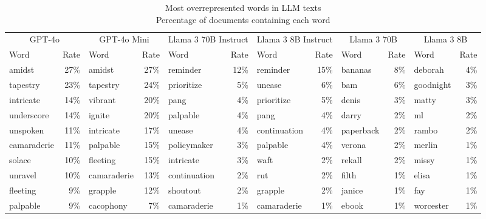 \begin{table}[!t]
\caption*{
{\large Most overrepresented words in LLM texts} \\ 
{\small Percentage of documents containing each word}
} 
\fontsize{12.0pt}{14.4pt}\selectfont
\begin{tabular*}{\linewidth}{@{\extracolsep{\fill}}lrlrlrlrlrlr}
\toprule
\multicolumn{2}{c}{GPT-4o} & \multicolumn{2}{c}{GPT-4o Mini} & \multicolumn{2}{c}{Llama 3 70B Instruct} & \multicolumn{2}{c}{Llama 3 8B Instruct} & \multicolumn{2}{c}{Llama 3 70B} & \multicolumn{2}{c}{Llama 3 8B} \\ 
\cmidrule(lr){1-2} \cmidrule(lr){3-4} \cmidrule(lr){5-6} \cmidrule(lr){7-8} \cmidrule(lr){9-10} \cmidrule(lr){11-12}
Word & Rate & Word & Rate & Word & Rate & Word & Rate & Word & Rate & Word & Rate \\ 
\midrule\addlinespace[2.5pt]
amidst & 27\% & amidst & 27\% & reminder & 12\% & reminder & 15\% & bananas & 8\% & deborah & 4\% \\ 
tapestry & 23\% & tapestry & 24\% & prioritize & 5\% & unease & 6\% & bam & 6\% & goodnight & 3\% \\ 
intricate & 14\% & vibrant & 20\% & pang & 4\% & prioritize & 5\% & denis & 3\% & matty & 3\% \\ 
underscore & 14\% & ignite & 20\% & palpable & 4\% & pang & 4\% & darry & 2\% & ml & 2\% \\ 
unspoken & 11\% & intricate & 17\% & unease & 4\% & continuation & 4\% & paperback & 2\% & rambo & 2\% \\ 
camaraderie & 11\% & palpable & 15\% & policymaker & 3\% & palpable & 4\% & verona & 2\% & merlin & 1\% \\ 
solace & 10\% & fleeting & 15\% & intricate & 3\% & waft & 2\% & rekall & 2\% & missy & 1\% \\ 
unravel & 10\% & camaraderie & 13\% & continuation & 2\% & rut & 2\% & filth & 1\% & elisa & 1\% \\ 
fleeting & 9\% & grapple & 12\% & shoutout & 2\% & grapple & 2\% & janice & 1\% & fay & 1\% \\ 
palpable & 9\% & cacophony & 7\% & camaraderie & 1\% & camaraderie & 1\% & ebook & 1\% & worcester & 1\% \\ 
\bottomrule
\end{tabular*}
\end{table}

